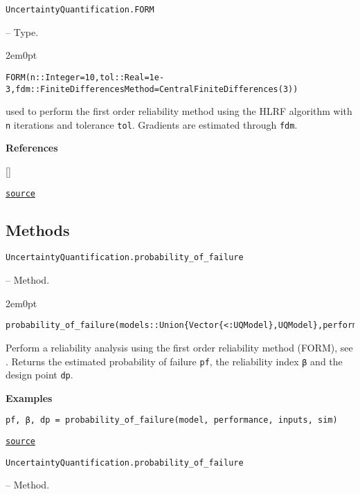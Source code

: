 \label{12125088992129103176}{}

\hypertarget{15353394232169751668}{\texttt{UncertaintyQuantification.FORM}}  -- {Type.}

\begin{adjustwidth}{2em}{0pt}


\begin{verbatim}
FORM(n::Integer=10,tol::Real=1e-3,fdm::FiniteDifferencesMethod=CentralFiniteDifferences(3))
\end{verbatim}

used to perform the first order reliability method using the HLRF algorithm with \texttt{n} iterations and tolerance \texttt{tol}. Gradients are estimated through \texttt{fdm}.

\textbf{References}

[]



\href{https://github.com/friesischscott/UncertaintyQuantification.jl/blob/f5ee6cce729f0d6a57979257379c942cdf42f86f/src/reliability/form.jl#L1-L9}{\texttt{source}}


\end{adjustwidth}

\subsection{Methods}



\label{15695795754956981461}{}

\hypertarget{6695762949520847822}{\texttt{UncertaintyQuantification.probability\_of\_failure}}  -- {Method.}

\begin{adjustwidth}{2em}{0pt}


\begin{verbatim}
probability_of_failure(models::Union{Vector{<:UQModel},UQModel},performance::Function),inputs::Union{Vector{<:UQInput},UQInput},sim::FORM)
\end{verbatim}

Perform a reliability analysis using the first order reliability method (FORM), see . Returns the estimated probability of failure \texttt{pf}, the reliability index \texttt{β} and the design point \texttt{dp}.

\textbf{Examples}


\begin{verbatim}
pf, β, dp = probability_of_failure(model, performance, inputs, sim)
\end{verbatim}



\href{https://github.com/friesischscott/UncertaintyQuantification.jl/blob/f5ee6cce729f0d6a57979257379c942cdf42f86f/src/reliability/form.jl#L24-L34}{\texttt{source}}


\end{adjustwidth}
\hypertarget{13167408614513251961}{\texttt{UncertaintyQuantification.probability\_of\_failure}}  -- {Method.}

